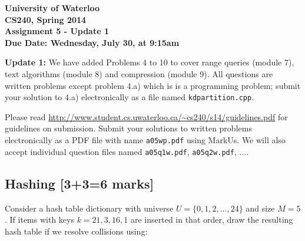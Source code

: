 \documentclass[12pt]{article}
\begin{document}
\begin{center}
  {\Large\bf University of Waterloo}\\ \vspace{3mm}
  {\Large\bf CS240, Spring 2014}\\ \vspace{2mm}
  {\Large\bf Assignment 5 - Update 1}\\ \vspace{3mm}
  \textbf{Due Date: Wednesday, July 30, at 9:15am}
\end{center}

\def\question#1{\item[\bf #1.]}
\def\part#1{\item[\bf #1)]}
\newcommand{\pc}[1]{\mbox{\textbf{#1}}} %

\textbf{Update 1: } We have added Problems 4 to 10 to cover 
range queries (module 7), text algorithms (module 8) and 
compression (module 9). 
All questions are written problems except problem 4.a) which is 
is a programming problem; submit your solution to 4.a) electronically
as a file named {\tt kdpartition.cpp}.

Please read
\url{http://www.student.cs.uwaterloo.ca/~cs240/s14/guidelines.pdf} for
guidelines on submission.
Submit your solutions to written problems electronically as a PDF file with
name {\tt a05wp.pdf} using MarkUs. We will also accept individual
question files named {\tt a05q1w.pdf}, {\tt a05q2w.pdf}, $\dots$.

\subsection{Hashing [3+3=6 marks]}
Consider a hash table dictionary with universe $U=\{0, 1, 2, \dots , 24\}$ and size $M =5$. If items with keys $k = 21, 3, 16, 1$ are inserted in that order, draw the resulting hash table if we resolve collisions using:
\end{document}
